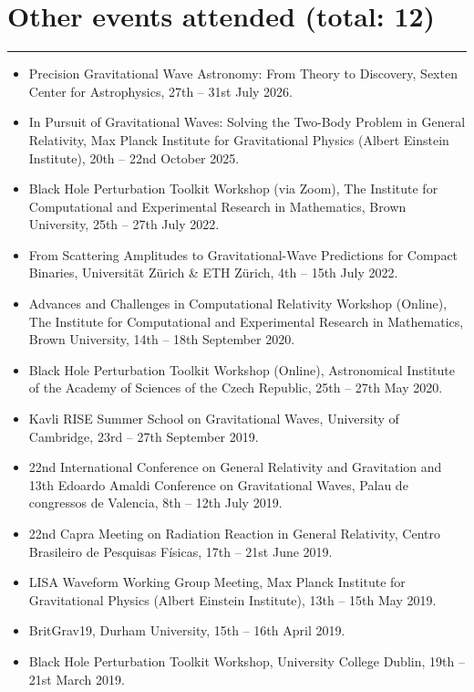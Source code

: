 \documentclass[10.5pt, oneside]{article}   	%
\begin{document}
{\color{Sectioncolour}
\section*{Other events attended {\rm (total: 12)}}
\vspace{-3mm}
\noindent\rule{\linewidth}{0.6pt}}
\begin{itemize}
\item Precision Gravitational Wave Astronomy: From Theory to Discovery, Sexten Center for Astrophysics, 27th -- 31st July 2026.
\item In Pursuit of Gravitational Waves: Solving the Two-Body Problem in General Relativity,  Max Planck Institute for Gravitational Physics (Albert Einstein Institute), 20th -- 22nd October 2025.
\item Black Hole Perturbation Toolkit Workshop (via Zoom), The Institute for Computational and Experimental Research in Mathematics, Brown University, 25th -- 27th July 2022.
\item From Scattering Amplitudes to Gravitational-Wave Predictions for Compact Binaries, Universität Zürich \& ETH Zürich, 4th -- 15th July 2022.
\item Advances and Challenges in Computational Relativity Workshop (Online), The Institute for Computational and Experimental Research in Mathematics, Brown University, 14th -- 18th September 2020.
\item Black Hole Perturbation Toolkit Workshop (Online), Astronomical Institute of the Academy of Sciences of the Czech Republic, 25th -- 27th May 2020.
\item Kavli RISE Summer School on Gravitational Waves, University of Cambridge, 23rd -- 27th September 2019.
\item 22nd International Conference on General Relativity and Gravitation and 13th Edoardo Amaldi Conference on Gravitational Waves, Palau de congressos de Valencia, 8th -- 12th July 2019.
\item 22nd Capra Meeting on Radiation Reaction in General Relativity, Centro Brasileiro de Pesquisas Físicas, 17th -- 21st June 2019.
\item LISA Waveform Working Group Meeting, Max Planck Institute for Gravitational Physics (Albert Einstein Institute), 13th -- 15th May 2019.
\item BritGrav19, Durham University, 15th -- 16th April 2019.
\item Black Hole Perturbation Toolkit Workshop, University College Dublin, 19th -- 21st March 2019.
\end{itemize} 
\end{document}
